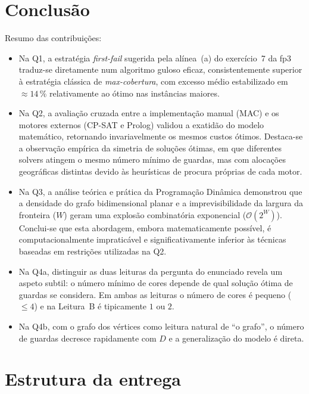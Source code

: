 \documentclass[11pt,a4paper]{article}
\begin{document}
\section{Conclusão}

Resumo das contribuições:
\begin{itemize}[topsep=2pt,itemsep=0pt]
  \item Na Q1, a estratégia \emph{first-fail} sugerida pela
    alínea~(a) do exercício~7 da fp3 traduz-se diretamente num
    algoritmo guloso eficaz, consistentemente superior à
    estratégia clássica de \emph{max-cobertura}, com excesso médio
    estabilizado em $\approx 14\,\%$ relativamente ao ótimo nas
    instâncias maiores.
  \item Na Q2, a avaliação cruzada entre a implementação manual (MAC)
    e os motores externos (CP-SAT e Prolog) validou a exatidão do
    modelo matemático, retornando invariavelmente os mesmos custos
    ótimos. Destaca-se a observação empírica da simetria de soluções
    ótimas, em que diferentes solvers atingem o mesmo número mínimo de
    guardas, mas com alocações geográficas distintas devido às
    heurísticas de procura próprias de cada motor.
  \item Na Q3, a análise teórica e prática da Programação Dinâmica
    demonstrou que a densidade do grafo bidimensional planar e a
    imprevisibilidade da largura da fronteira ($W$) geram uma explosão
    combinatória exponencial ($\mathcal{O}(2^W)$). Conclui-se que esta
    abordagem, embora matematicamente possível, é computacionalmente
    impraticável e significativamente inferior às técnicas baseadas em
    restrições utilizadas na Q2.
  \item Na Q4a, distinguir as duas leituras da pergunta do enunciado
    revela um aspeto subtil: o número mínimo de cores depende de qual
    solução ótima de guardas se considera. Em ambas as leituras o
    número de cores é pequeno ($\le 4$) e na Leitura~B é tipicamente
    $1$ ou $2$.
  \item Na Q4b, com o grafo dos vértices como leitura natural de
    ``o grafo'', o número de guardas decresce rapidamente com $D$
    e a generalização do modelo é direta.
\end{itemize}

\appendix
\section{Estrutura da entrega}
\end{document}
